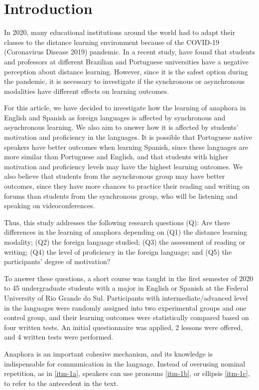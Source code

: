 \documentclass{textolivre}
\begin{document}
\section{Introduction}\label{sec-intro}
In 2020, many educational institutions around the world had to adapt their
classes to the distance learning environment because of the COVID-19
(Coronavirus Disease 2019) pandemic. In a recent study, \textcite{bruscato_teaching_2020} 
have found that students and professors at different Brazilian and
Portuguese universities have a negative perception about distance learning.
However, since it is the safest option during the pandemic, it is necessary to
investigate if the synchronous or asynchronous modalities have different
effects on learning outcomes.

For this article, we have decided to investigate how the learning of anaphora
in English and Spanish as foreign languages is affected by synchronous and
asynchronous learning. We also aim to answer how it is affected by students’
motivation and proficiency in the languages. It is possible that Portuguese
native speakers have better outcomes when learning Spanish, since these
languages are more similar than Portuguese and English, and that students with
higher motivation and proficiency levels may have the highest learning
outcomes. We also believe that students from the asynchronous group may have
better outcomes, since they have more chances to practice their reading and
writing on forums than students from the synchronous group, who will be
listening and speaking on videoconferences.

Thus, this study addresses the following research questions (Q): Are there
differences in the learning of anaphora depending on (Q1) the distance learning
modality; (Q2) the foreign language studied; (Q3) the assessment of reading or
writing; (Q4) the level of proficiency in the foreign language; and (Q5) the
participants’ degree of motivation?

To answer these questions, a short course was taught in the first semester of
2020 to 45 undergraduate students with a major in English or Spanish at the
Federal University of Rio Grande do Sul. Participants with
intermediate/advanced level in the languages were randomly assigned into two
experimental groups and one control group, and their learning outcomes were
statistically compared based on four written tests. An initial questionnaire
was applied, 2 lessons were offered, and 4 written tests were performed.

Anaphora is an important cohesive mechanism, and its knowledge is indispensable
for communication in the language. Instead of overusing nominal repetition, as
in \ref{itm-1a}, speakers can use pronouns \ref{itm-1b}, or ellipsis \ref{itm-1c}, to refer to the
antecedent in the text.
\end{document}
